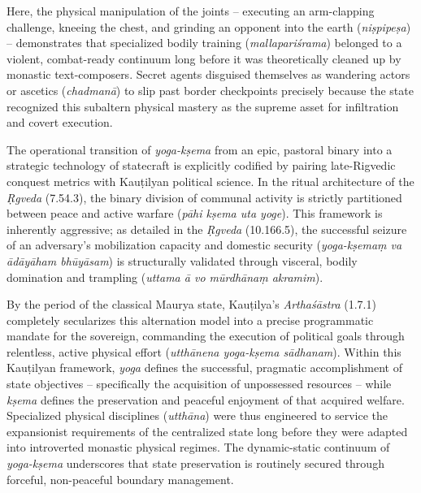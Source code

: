 \documentclass[11pt,twoside,letterpaper]{article}
\begin{document}
Here, the physical manipulation of the joints – executing an arm-clapping challenge, kneeing the chest, and grinding an opponent into the earth (\textit{ni\d{s}pipe\d{s}a}) – demonstrates that specialized bodily training (\textit{mallapari\'srama}) belonged to a violent, combat-ready continuum long before it was theoretically cleaned up by monastic text-composers. Secret agents disguised themselves as wandering actors or ascetics (\textit{chadman\={a}}) to slip past border checkpoints precisely because the state recognized this subaltern physical mastery as the supreme asset for infiltration and covert execution.

The operational transition of \textit{yoga-k\d{s}ema} from an epic, pastoral binary into a strategic technology of statecraft is explicitly codified by pairing late-Rigvedic conquest metrics with Kau\d{t}ilyan political science. In the ritual architecture of the \textit{\d{R}gveda} (7.54.3), the binary division of communal activity is strictly partitioned between peace and active warfare (\textit{p\={a}hi k\d{s}ema uta yoge}). This framework is inherently aggressive; as detailed in the \textit{\d{R}gveda} (10.166.5), the successful seizure of an adversary’s mobilization capacity and domestic security (\textit{yoga-k\d{s}ema\d{m} va \={a}d\={a}y\={a}ham bh\={u}y\={a}sam}) is structurally validated through visceral, bodily domination and trampling (\textit{uttama \={a} vo m\={u}rdh\={a}na\d{m} akramim}). 

By the period of the classical Maurya state, Kau\d{t}ilya’s \textit{Artha\'s\={a}stra} (1.7.1) completely secularizes this alternation model into a precise programmatic mandate for the sovereign, commanding the execution of political goals through relentless, active physical effort (\textit{utth\={a}nena yoga-k\d{s}ema s\={a}dhanam}). Within this Kau\d{t}ilyan framework, \textit{yoga} defines the successful, pragmatic accomplishment of state objectives – specifically the acquisition of unpossessed resources – while \textit{k\d{s}ema} defines the preservation and peaceful enjoyment of that acquired welfare. Specialized physical disciplines (\textit{utth\={a}na}) were thus engineered to service the expansionist requirements of the centralized state long before they were adapted into introverted monastic physical regimes. The dynamic-static continuum of \textit{yoga-k\d{s}ema} underscores that state preservation is routinely secured through forceful, non-peaceful boundary management.

\end{document}
